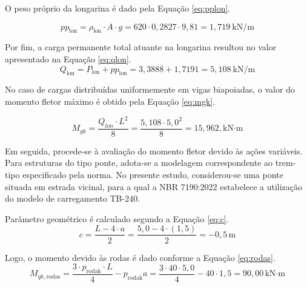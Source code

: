 O peso próprio da longarina é dado pela Equação \eqref{eq:pplon}.

\begin{equation}
pp_{\text{lon}} = \rho_{\text{lon}} \cdot A \cdot g
                = 620 \cdot 0{,}2827 \cdot 9{,}81
                = 1{,}719\ \text{kN/m}
\label{eq:pplon}            
\end{equation}

Por fim, a carga permanente total atuante na longarina resultou no valor apresentado na Equação \eqref{eq:qlon}.
\begin{equation}
Q_{\text{lon}} = P_{\text{lon}} + pp_{\text{lon}}
               = 3{,}3888 + 1{,}7191
               = 5{,}108\ \text{kN/m}
\label{eq:qlon}               
\end{equation}

No caso de cargas distribuídas uniformemente em vigas biapoiadas, o valor do momento fletor máximo é obtido pela Equação \eqref{eq:mgk}.

\begin{equation}
M_{gk} = \frac{Q_{lon} \cdot L^2}{8}
       = \frac{5{,}108 \cdot 5{,}0^2}{8}
       = 15{,}962,\text{kN·m}
\label{eq:mgk}
\end{equation}

Em seguida, procede-se à avaliação do momento fletor devido às ações variáveis. Para estruturas do tipo ponte, adota-se a modelagem correspondente ao trem-tipo especificado pela norma. No presente estudo, considerou-se uma ponte situada em estrada vicinal, para a qual a NBR 7190:2022 estabelece a utilização do modelo de carregamento TB-240.

Parâmetro geométrico é calculado segundo a Equação \eqref{eq:c}.
\begin{equation}
c = \frac{L - 4\cdot a}{2}
  = \frac{5{,}0 - 4\cdot(1{,}5)}{2}
  = - 0{,}5\,\text{m}
\label{eq:c}
\end{equation}

Logo, o momento devido às rodas é dado conforme a Equação \eqref{eq:rodas}.
\begin{equation}
M_{qk,\text{rodas}} = \frac{3 \cdot p_{\text{rodak}} \cdot L}{4} - p_{\text{rodak}} a
                    = \frac{3\cdot40\cdot5{,}0}{4} - 40\cdot1{,}5
                    = 90{,}00\,\text{kN·m}
\label{eq:rodas}
\end{equation}


